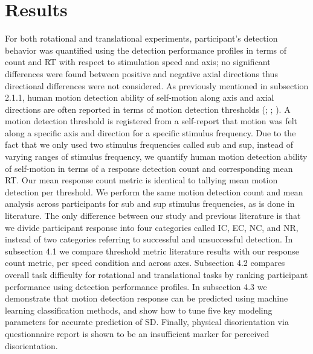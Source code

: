 \documentclass[11pt, onecolumn]{article}
\begin{document}
\section{Results}
For both rotational and translational experiments, participant’s detection behavior was quantified using the detection performance profiles in terms of count and RT with respect to stimulation speed and axis; no significant differences were found between positive and negative axial directions thus directional differences were not considered.  As previously mentioned in subsection 2.1.1, human motion detection ability of self-motion along axis and axial directions are often reported in terms of motion detection thresholds (\cite{Valko_2012_Vestibular}; \cite{Hartmann_2014_Direction}; \cite{Karmali_2017_Multivariate}).  A motion detection threshold is registered from a self-report that motion was felt along a specific axis and direction for a specific stimulus frequency.  Due to the fact that we only used two stimulus frequencies called sub and sup, instead of varying ranges of stimulus frequency, we quantify human motion detection ability of self-motion in terms of a response detection count and corresponding mean RT.  Our mean response count metric is identical to tallying mean motion detection per threshold.  We perform the same motion detection count and mean analysis across participants for sub and sup stimulus frequencies, as is done in literature.  The only difference between our study and previous literature is that we divide participant response into four categories called IC, EC, NC, and NR,  instead of two categories referring to successful and unsuccessful detection.  In subsection 4.1 we compare threshold metric literature results with our response count metric, per speed condition and across axes.  Subsection 4.2 compares overall task difficulty for rotational and translational tasks by ranking participant performance using detection performance profiles.  In subsection 4.3 we demonstrate that motion detection response can be predicted using machine learning classification methods, and show how to tune five key modeling parameters for accurate prediction of SD.  Finally, physical disorientation via questionnaire report is shown to be an insufficient marker for perceived disorientation.
\end{document}
